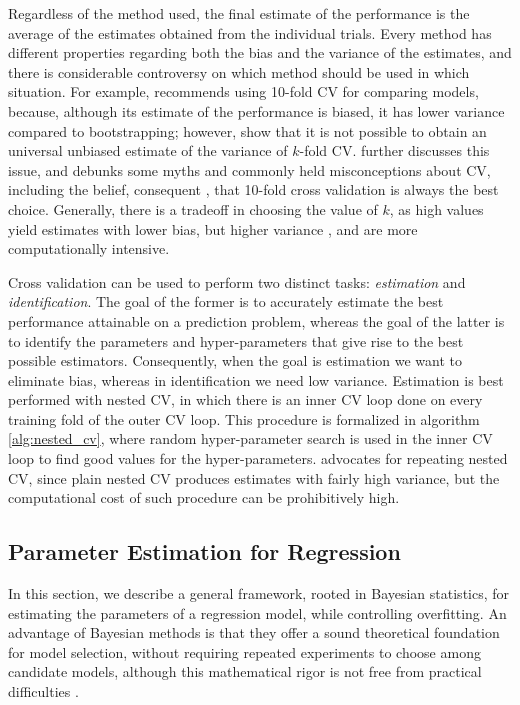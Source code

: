 \documentclass[a4paper,11pt]{kth-mag}
\begin{document}
Regardless of the method used, the final estimate of the performance is the average of the estimates obtained from the individual trials. Every method has different properties regarding both the bias and the variance of the estimates, and there is considerable controversy on which method should be used in which situation. For example, \cite{cv_bootstrap} recommends using 10-fold CV for comparing models, because, although its estimate of the performance is biased, it has lower variance compared to bootstrapping; however, \cite{no_unbiased_cv} show that it is not possible to obtain an universal unbiased estimate of the variance of $k$-fold CV. \cite{cvmyths} further discusses this issue, and debunks some myths and commonly held misconceptions about CV, including the belief, consequent \cite{cv_bootstrap}, that 10-fold cross validation is always the best choice. Generally, there is a tradeoff in choosing the value of $k$, as high values yield estimates with lower bias, but higher variance \citep{cv_survey}, and are more computationally intensive.

Cross validation can be used to perform two distinct tasks: \emph{estimation} and \emph{identification}. The goal of the former is to accurately estimate the best performance attainable on a prediction problem, whereas the goal of the latter is to identify the parameters and hyper-parameters that give rise to the best possible estimators. Consequently, when the goal is estimation we want to eliminate bias, whereas in identification we need low variance. Estimation is best performed with nested CV\citep{nested_cv_stone,nested_cv_varma}, in which there is an inner CV loop done on every training fold of the outer CV loop. This procedure is formalized in algorithm \ref{alg:nested_cv}, where random hyper-parameter search \citep{random_search} is used in the inner CV loop to find good values for the hyper-parameters. \cite{cv_pitfalls} advocates for repeating nested CV, since plain nested CV produces estimates with fairly high variance, but the computational cost of such procedure can be prohibitively high.


\subsection{Parameter Estimation for Regression}
\label{sec:regression_fit}

In this section, we describe a general framework, rooted in Bayesian statistics, for estimating the parameters of a regression model, while controlling overfitting. An advantage of Bayesian methods is that they offer a sound theoretical foundation for model selection, without requiring repeated experiments to choose among candidate models, although this mathematical rigor is not free from practical difficulties \citep{bayesian_model_selection, practical_bayesian_model_selection}.
\end{document}
